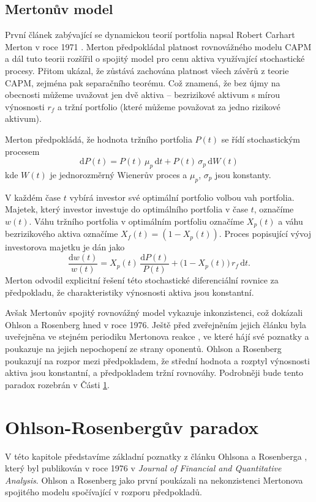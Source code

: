 \documentclass[a4paper,12pt]{report}
\theoremstyle{definition} \newtheorem{definice}[veta]{Definice}
\theoremstyle{remark}
\begin{document}
\subsection{Mertonův model}
První článek zabývající se dynamickou teorií portfolia napsal Robert Carhart Merton v roce 1971 \cite{merton1971}.
Merton předpokládal platnost rovnovážného modelu CAPM a dál tuto teorii rozšířil o spojitý model pro cenu aktiva využívající stochastické procesy.
Přitom ukázal, že zůstává zachována platnost všech závěrů z teorie CAPM, zejména pak separačního teorému.
Což znamená, že bez újmy na obecnosti můžeme uvažovat jen dvě aktiva -- bezrizikové aktivum s mírou výnosnosti $r_f$ a tržní portfolio (které můžeme považovat za jedno rizikové aktivum). 

Merton předpokládá, že hodnota tržního portfolia $P(t)$ se řídí stochastickým procesem
$$\mathrm{d}P(t)=P(t)\,\mu_p\,\mathrm{d}t+P(t)\,\sigma_p\,\mathrm{d}W(t)$$
kde $W(t)$ je jednorozměrný Wienerův proces a $\mu_p$, $\sigma_p$ jsou konstanty. 

V každém čase $t$ vybírá investor své optimální portfolio volbou vah portfolia.
Majetek, který investor investuje do optimálního portfolia v čase $t$, označíme $w(t)$.
Váhu tržního portfolia v optimálním portfoliu označíme $X_p(t)$ a váhu bezrizikového aktiva označíme $X_f(t)=(1-X_p(t))$. 
Proces popisující vývoj investorova majetku je dán jako
$$\frac{\mathrm{d}w(t)}{w(t)}=X_p(t)\,\frac{\mathrm{d}P(t)}{P(t)}+\big(1-X_p(t)\big)\,r_f\,\mathrm{d}t.$$
Merton odvodil explicitní řešení této stochastické diferenciální rovnice za předpokladu, že charakteristiky výnosnosti aktiva jsou konstantní.

Avšak Mertonův spojitý rovnovážný model vykazuje inkonzistenci, což dokázali Ohlson a Rosenberg \cite{ohlson} hned v roce 1976.
Ještě před zveřejněním jejich článku byla uveřejněna ve stejném periodiku Mertonova reakce \cite{merton1975}, ve které hájí své poznatky a poukazuje na jejich nepochopení ze strany oponentů.  
Ohlson a Rosenberg \cite {ohlson} poukazují na rozpor mezi předpokladem, že střední hodnota a rozptyl výnosnosti aktiva jsou konstantní, a předpokladem tržní rovnováhy.
Podrobněji bude tento paradox rozebrán v Části \ref{paradox}.


\section{Ohlson-Rosenbergův paradox}\label{paradox}
V této kapitole představíme základní poznatky z článku Ohlsona a Rosenberga \cite{ohlson}, který byl publikován v roce 1976 v \textit{Journal of Financial and Quantitative Analysis}.
Ohlson a Rosenberg jako první poukázali na nekonzistenci Mertonova spojitého modelu \cite{merton1971} spočívající v rozporu předpokladů.
\end{document}
